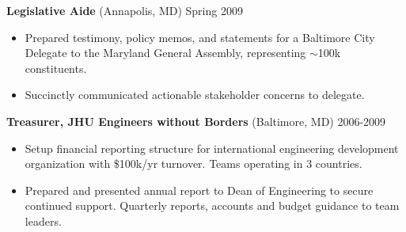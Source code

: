 \documentclass[margin]{res}
\newcommand{\locdatesubsection}[3]{\textbf{#1} (#2) \hfill #3}
\begin{document}
\begin{sloppypar}
\begin{resume}



\locdatesubsection{Legislative Aide}{Annapolis, MD}{Spring 2009}
\begin{itemize}
    \item Prepared testimony, policy memos, and statements for a Baltimore City Delegate to the Maryland General Assembly, representing $\sim$100k constituents.
    \item Succinctly communicated actionable stakeholder concerns to delegate.
\end{itemize}

\locdatesubsection{Treasurer, JHU Engineers without Borders}{Baltimore, MD}{2006-2009}
    \begin{itemize}
        \item Setup financial reporting structure for international engineering development organization with \$100k/yr turnover. Teams operating in 3 countries.
        \item Prepared and presented annual report to Dean of Engineering to secure continued support. Quarterly reports, accounts and budget guidance to team leaders.
    \end{itemize}


\end{resume}
\end{sloppypar}
\end{document}
